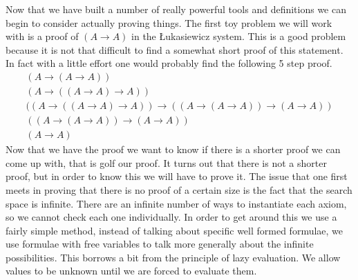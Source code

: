 \documentclass{article}
\begin{document}
Now that we have built a number of really powerful tools and definitions we can begin to consider actually proving things.
The first toy problem we will work with is a proof of $(A\rightarrow A)$ in the \L ukasiewicz system.
This is a good problem because it is not that difficult to find a somewhat short proof of this statement.
In fact with a little effort one would probably find the following 5 step proof.
\begin{gather*}
(A\rightarrow(A\rightarrow A)) \tag*{L.S.1}\\
(A\rightarrow((A\rightarrow A)\rightarrow A)) \tag*{L.S.1}\\
((A\rightarrow((A\rightarrow A)\rightarrow A))\rightarrow((A\rightarrow(A\rightarrow A))\rightarrow(A\rightarrow A)) \tag*{L.S.2}\\
((A\rightarrow(A\rightarrow A))\rightarrow(A\rightarrow A)) \tag*{M.P. (2,3)}\\
(A\rightarrow A) \tag*{M.P. (1,4)}
\end{gather*}
Now that we have the proof we want to know if there is a shorter proof we can come up with, that is golf our proof.
It turns out that there is not a shorter proof, but in order to know this we will have to prove it.
The issue that one first meets in proving that there is no proof of a certain size is the fact that the search space is infinite.
There are an infinite number of ways to instantiate each axiom, so we cannot check each one individually.
In order to get around this we use a fairly simple method, instead of talking about specific well formed formulae, we use formulae with free variables to talk more generally about
the infinite possibilities.
This borrows a bit from the principle of lazy evaluation.
We allow values to be unknown until we are forced to evaluate them.
\end{document}

